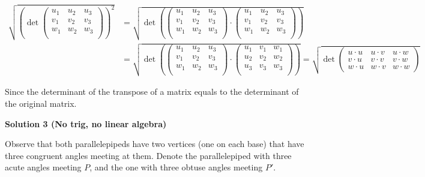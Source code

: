 \begin{enumerate}
{{ \begin{align*}\sqrt{\left (\operatorname{det} \begin{pmatrix}u_1 & u_2 & u_3 \\v_1 & v_2 & v_3 \\w_1 & w_2 & w_3 \\\end{pmatrix}\right)^2} &= \sqrt{\operatorname{det} \left( \begin{pmatrix}u_1 & u_2 & u_3 \\v_1 & v_2 & v_3 \\w_1 & w_2 & w_3 \\\end{pmatrix} \cdot \begin{pmatrix}u_1 & u_2 & u_3 \\v_1 & v_2 & v_3 \\w_1 & w_2 & w_3 \\\end{pmatrix} \right) } \\&= \sqrt{\operatorname{det} \left( \begin{pmatrix}u_1 & u_2 & u_3 \\v_1 & v_2 & v_3 \\w_1 & w_2 & w_3 \\\end{pmatrix} \cdot \begin{pmatrix}u_1 & v_1 & w_1 \\u_2 & v_2 & w_2 \\u_3 & v_3 & w_3 \\\end{pmatrix} \right) } = \sqrt{\operatorname{det} \begin{pmatrix}u \cdot u & u \cdot v & u \cdot w \\v \cdot u & v \cdot v & v \cdot w \\w \cdot u & w \cdot v & w \cdot w\end{pmatrix} } \end{align*}


 Since the determinant of the transpose of a matrix equals to the determinant of the original matrix.

 



\textbf{Solution 3 (No trig, no linear algebra)}

Observe that both parallelepipeds have two vertices (one on each base) that have three congruent angles meeting at them. Denote the parallelepiped with three acute angles meeting $P$, and the one with three obtuse angles meeting $P'$.

}}
\end{enumerate}
